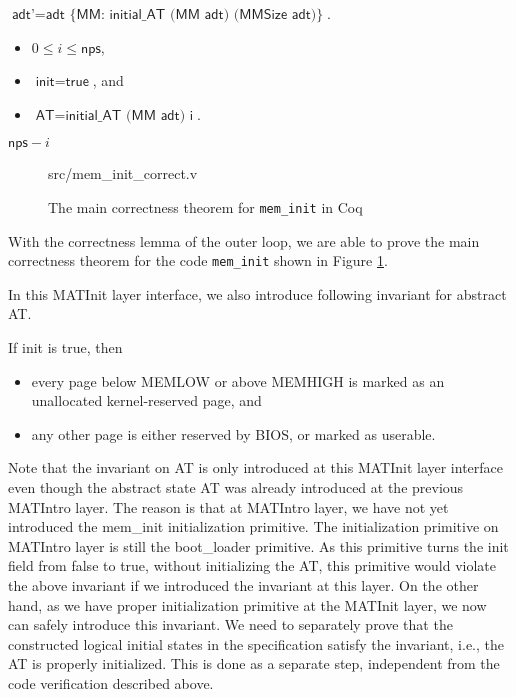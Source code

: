 \begin{definition}[Postcondition] 
$\textsf{adt'}=\textsf{adt \{MM: initial\_AT (MM adt) (MMSize adt)\}}$.
\end{definition}

\begin{definition}
\begin{itemize}
\item $0\le i \le \textsf{nps}$,
\item $\textsf{init}=\textsf{true}$, and
\item $\textsf{AT}=\textsf{initial\_AT (MM adt) i}$.
\end{itemize}
\end{definition}

\begin{definition}
$\textsf{nps}-i$
\end{definition}

\begin{figure}
	 {src/mem_init_correct.v}
	\caption{The main correctness theorem for \texttt{mem\_init} in Coq}
	\label{fig:mem_init_correct_v}
\end{figure}

With the correctness lemma of the outer loop, we are able to prove the main correctness theorem for
the code \texttt{mem\_init} shown in Figure \ref{fig:mem_init_correct_v}.

In this MATInit layer interface, we also introduce following invariant for abstract \textsf{AT}.

\begin{invariant}[valid AT] If \textsf{init} is \textsf{true}, then
\begin{itemize}
\item every page below \textsf{MEMLOW} or above \textsf{MEMHIGH} is marked as an unallocated kernel-reserved page, and
\item any other page is either reserved by BIOS, or marked as userable.
\end{itemize}
\end{invariant}

Note that the invariant on \textsf{AT} is only introduced at this MATInit layer interface even though the abstract
state \textsf{AT} was already introduced at the previous MATIntro layer. The reason is that at MATIntro layer, 
we have not yet introduced the \textsf{mem\_init} initialization primitive. The initialization primitive on MATIntro layer
is still the \textsf{boot\_loader} primitive. As this primitive turns the \textsf{init} field from \textsf{false} to \textsf{true},
without initializing the \textsf{AT}, this primitive would violate the above invariant if we introduced the invariant at this layer.
On the other hand, as we have proper initialization primitive at the MATInit layer, we now can safely introduce this invariant.
We need to separately prove that the constructed logical initial states in the specification satisfy the invariant, i.e., the \textsf{AT}
is properly initialized. This is done as a separate step, independent from the code verification described above.


